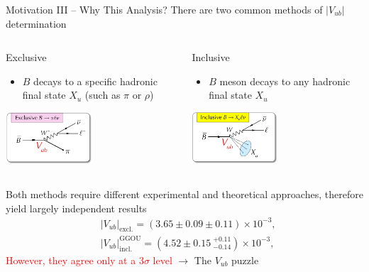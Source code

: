 \documentclass[serif]{beamer}
\newcommand {\E}[1]{\times 10^{#1}}
\begin{document}

\begin{frame}[t]{Motivation III -- Why This Analysis?}
\small
\vspace{-3mm}
There are two common methods of $\vert V_{ub}\vert $ determination
\begin{columns}
	\begin{block}{}
		Exclusive
		\begin{itemize}
			\item $B$ decays to a specific hadronic final state $X_u$ (such as $\pi$ or $\rho$)
		\end{itemize}
\begin{center}
	\vspace{-3mm}
		\includegraphics[width=0.5\textwidth]{fig/excl}
\end{center}
	\end{block}
	\begin{block}{}
		Inclusive
		\begin{itemize}
			\item $B$ meson decays to any hadronic final state $X_u$
		\end{itemize}
\begin{center}
	\vspace{-3mm}
	\includegraphics[width=0.5\textwidth]{fig/incl}
\end{center}
\end{block}
\end{columns}

\vspace{3mm}
Both methods require different experimental and theoretical approaches, therefore yield largely independent results
\begin{align*}
&\vert V_{ub} \vert_{\mathrm{excl.}} = \left(3.65 \pm 0.09 \pm 0.11\right)\E{-3},\\
&\vert V_{ub} \vert_{\mathrm{incl.}}^{\mathrm{GGOU}} = \left(4.52 \pm 0.15~{}^{+0.11}_{-0.14}\right)\E{-3},
\end{align*}
\textcolor{red}{However, they agree only at a $3\sigma$ level} $\to$ The $V_{ub}$ puzzle

\end{frame}
\end{document}

